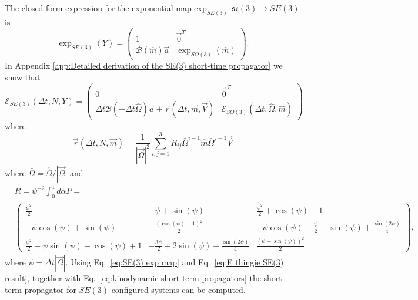 The closed form expression for the exponential map $\text{exp}_{SE(3)} : \mathfrak{se}(3) \to SE(3)$ is \citep{blancoTutorialSETransformation}
\begin{equation} \label{eq:SE(3) exp map}
	\exp_{SE(3)}(Y) = \begin{pmatrix}
		1 & \vec{0}^T \\
		\mathscr{B}(\hat{m}) \vec{a} & \exp_{SO(3)}(\hat{m})
	\end{pmatrix}.
\end{equation}
In Appendix \ref{app:Detailed derivation of the SE(3) short-time propagator} we show that
\begin{equation} \label{eq:E thingie SE(3) result}
	\mathscr{E}_{SE(3)}(\Delta t, N, Y)  = \begin{pmatrix}
		0 & \vec{0}^T \\
		\Delta t \mathscr{B}( - \Delta t \hat{\Omega}) \vec{a} + \vec{r}(\Delta t, \vec{m}, \vec{V}) & \mathscr{E}_{SO(3)}(\Delta t, \hat{\Omega}, \hat{m})
		\end{pmatrix}
\end{equation}
where
\begin{equation}
	\vec{r}(\Delta t, N, \vec{m}) = \frac{1}{|\vec{\Omega}|^2} \sum_{i,j=1}^{3} R_{ij} \bar{\Omega}^{i-1} \hat{m} \bar{\Omega}^{j-1} \vec{V}
\end{equation}
where $\bar{\Omega} = \hat{\Omega} / |\vec{\Omega}|$ and
\footnotesize
\begin{equation} \label{eq:geometric integrator R matrix main}
\begin{aligned}
	& R = \psi^{-2} \int_0^1 d\alpha P =  \\
	& \begin{pmatrix}
\frac{\psi^{2}}{2} & - \psi + \sin{\left(\psi \right)} & \frac{\psi^{2}}{2} + \cos{\left(\psi \right)} - 1\\
- \psi \cos{\left(\psi \right)} + \sin{\left(\psi \right)} & - \frac{\left(\cos{\left(\psi \right)} - 1\right)^{2}}{2} &
 - \psi \cos{\left(\psi \right)} - \frac{\psi}{2} 
 + \sin{\left(\psi \right)} + \frac{\sin{\left(2 \psi \right)}}{4}  \\
\frac{\psi^{2}}{2} - \psi \sin{\left(\psi \right)} - \cos{\left(\psi \right)} + 1 & - \frac{3 \psi}{2} + 2 \sin{\left(\psi \right)} - \frac{\sin{\left(2 \psi \right)}}{4} & \frac{\left(\psi - \sin{\left(\psi \right)}\right)^{2}}{2}
	\end{pmatrix},
\end{aligned}
\end{equation}
\normalsize
where $\psi = \Delta t |\vec{\Omega}|$. Using Eq.~\ref{eq:SE(3) exp map} and Eq.~\ref{eq:E thingie SE(3) result}, together with Eq.~\ref{eq:kinodynamic short term propagators} the short-term propagator for $SE(3)$-configured systems can be computed.

